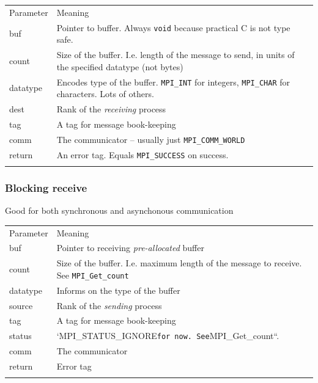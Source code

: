 \begin{longtable}[c]{@{}ll@{}}
\toprule\addlinespace
Parameter & Meaning
\\\addlinespace
\midrule\endhead
buf & Pointer to buffer. Always \texttt{void} because practical C is not
type safe.
\\\addlinespace
count & Size of the buffer. I.e. length of the message to send, in units
of the specified datatype (not bytes)
\\\addlinespace
datatype & Encodes type of the buffer. \texttt{MPI\_INT} for integers,
\texttt{MPI\_CHAR} for characters. Lots of others.
\\\addlinespace
dest & Rank of the \emph{receiving} process
\\\addlinespace
tag & A tag for message book-keeping
\\\addlinespace
comm & The communicator -- usually just \texttt{MPI\_COMM\_WORLD}
\\\addlinespace
return & An error tag. Equals \texttt{MPI\_SUCCESS} on success.
\\\addlinespace
\bottomrule
\end{longtable}

\subsubsection{Blocking receive}\label{blocking-receive}

\begin{Shaded}
\begin{Highlighting}[]
     
\end{Highlighting}
\end{Shaded}

Good for both synchronous and asynchonous communication

\begin{longtable}[c]{@{}ll@{}}
\toprule\addlinespace
Parameter & Meaning
\\\addlinespace
\midrule\endhead
buf & Pointer to receiving \emph{pre-allocated} buffer
\\\addlinespace
count & Size of the buffer. I.e. maximum length of the message to
receive. See \texttt{MPI\_Get\_count}
\\\addlinespace
datatype & Informs on the type of the buffer
\\\addlinespace
source & Rank of the \emph{sending} process
\\\addlinespace
tag & A tag for message book-keeping
\\\addlinespace
status & `MPI\_STATUS\_IGNORE\texttt{for now. See}MPI\_Get\_count``.
\\\addlinespace
comm & The communicator
\\\addlinespace
return & Error tag
\\\addlinespace
\bottomrule
\end{longtable}

